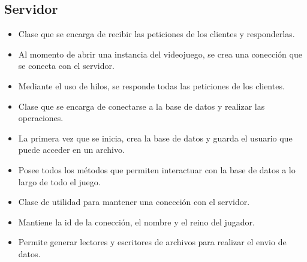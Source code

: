 \documentclass{article}
\begin{document}
\subsection{Servidor}

\begin{itemize}
	\item Clase que se encarga de recibir las peticiones de los clientes y responderlas.
	\item Al momento de abrir una instancia del videojuego, se crea una conección que se conecta con el servidor.
	\item Mediante el uso de hilos, se responde todas las peticiones de los clientes.
\end{itemize}

\begin{itemize}
	\item Clase que se encarga de conectarse a la base de datos y realizar las operaciones.
	\item La primera vez que se inicia, crea la base de datos y guarda el usuario que puede acceder en un archivo.
	\item Posee todos los métodos que permiten interactuar con la base de datos a lo largo de todo el juego.
\end{itemize}

\begin{itemize}
	\item Clase de utilidad para mantener una conección con el servidor.
	\item Mantiene la id de la conección, el nombre y el reino del jugador.
	\item Permite generar lectores y escritores de archivos para realizar el envio de datos.
\end{itemize}
\end{document}
